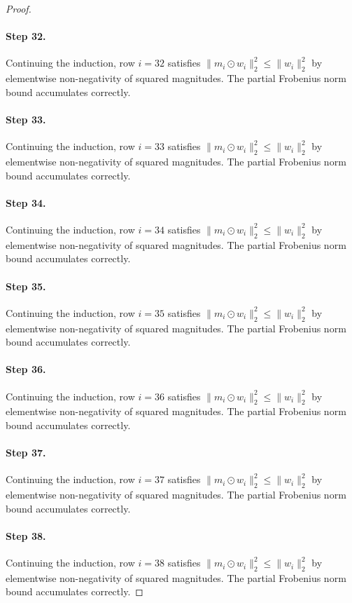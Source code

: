 \begin{proof}
\paragraph{Step 32.}
Continuing the induction, row $i=32$
satisfies $\|m_i \odot w_i\|_2^2 \leq \|w_i\|_2^2$ by elementwise non-negativity
of squared magnitudes.  The partial Frobenius norm bound accumulates correctly.

\paragraph{Step 33.}
Continuing the induction, row $i=33$
satisfies $\|m_i \odot w_i\|_2^2 \leq \|w_i\|_2^2$ by elementwise non-negativity
of squared magnitudes.  The partial Frobenius norm bound accumulates correctly.

\paragraph{Step 34.}
Continuing the induction, row $i=34$
satisfies $\|m_i \odot w_i\|_2^2 \leq \|w_i\|_2^2$ by elementwise non-negativity
of squared magnitudes.  The partial Frobenius norm bound accumulates correctly.

\paragraph{Step 35.}
Continuing the induction, row $i=35$
satisfies $\|m_i \odot w_i\|_2^2 \leq \|w_i\|_2^2$ by elementwise non-negativity
of squared magnitudes.  The partial Frobenius norm bound accumulates correctly.

\paragraph{Step 36.}
Continuing the induction, row $i=36$
satisfies $\|m_i \odot w_i\|_2^2 \leq \|w_i\|_2^2$ by elementwise non-negativity
of squared magnitudes.  The partial Frobenius norm bound accumulates correctly.

\paragraph{Step 37.}
Continuing the induction, row $i=37$
satisfies $\|m_i \odot w_i\|_2^2 \leq \|w_i\|_2^2$ by elementwise non-negativity
of squared magnitudes.  The partial Frobenius norm bound accumulates correctly.

\paragraph{Step 38.}
Continuing the induction, row $i=38$
satisfies $\|m_i \odot w_i\|_2^2 \leq \|w_i\|_2^2$ by elementwise non-negativity
of squared magnitudes.  The partial Frobenius norm bound accumulates correctly.


\end{proof}
